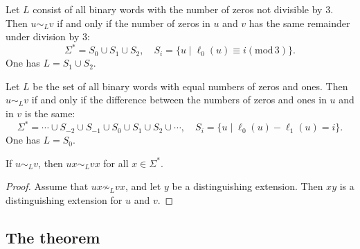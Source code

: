 \begin{page}

\begin{exl}
Let $L$ consist of all binary words with the number of zeros not divisible by $3$.
Then $u \sim_L v$ if and only if the number of zeros in $u$ and $v$ has the same remainder under division by $3$:
\[
\Sigma^* = S_0 \cup S_1 \cup S_2, \quad S_i = \{u \mid \ell_0(u) \equiv i (\mathrm{mod}\, 3)\}.
\]
One has $L = S_1 \cup S_2$.
\end{exl}

\end{page}

\begin{page}

\begin{exl}
Let $L$ be the set of all binary words with equal numbers of zeros and ones.
Then $u \sim_L v$ if and only if the difference between the numbers of zeros and ones in $u$ and in $v$ is the same:
\[
\Sigma^* = \cdots \cup S_{-2} \cup S_{-1} \cup S_0 \cup S_1 \cup S_2 \cup \cdots, \quad S_i = \{u \mid \ell_0(u) - \ell_1(u) = i\}.
\]
One has $L = S_0$.
\end{exl}

\end{page}

\begin{page}

\begin{lem}
\label{lem:LEquivRInvar}
If $u \sim_L v$, then $ux \sim_L vx$ for all $x \in \Sigma^*$.
\end{lem}

\end{page}

\begin{page}

\begin{proof}
Assume that $ux \not\sim_L vx$, and let $y$ be a distinguishing extension.
Then $xy$ is a distinguishing extension for $u$ and $v$.
\end{proof}




\end{page}

\begin{page}

\subsection{The theorem}

\end{page}

